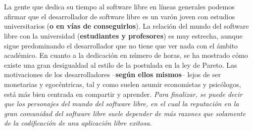 \documentclass{book}
\begin{document}
\\
\\
La gente que dedica su tiempo al software libre en líneas generales podemos afirmar que el desarrollador de software libre es un varón joven con estudios universitarios ({\bf o en vías de conseguirlos}). La relación del mundo del software libre con la universidad ({\bf estudiantes y profesores}) es muy estrecha, aunque sigue predominando el desarrollador que no tiene que ver nada con el ámbito académico. En cuanto a la dedicación en número de horas, se ha mostrado cómo existe una gran desigualdad al estilo de la postulada en la ley de Pareto. 
Las motivaciones de los desarrolladores –{\bf según ellos mismos}– lejos de ser monetarias y egocéntricas, tal y como suelen asumir economistas y psicólogos, está más bien centrada en compartir y aprender. \emph{Para finalizar, se puede decir que los personajes del mundo del software libre, en el cual la reputación en la gran comunidad del software libre suele depender de más razones que solamente de la codificación de una aplicación libre exitosa}.
\\
\\
\end{document}
